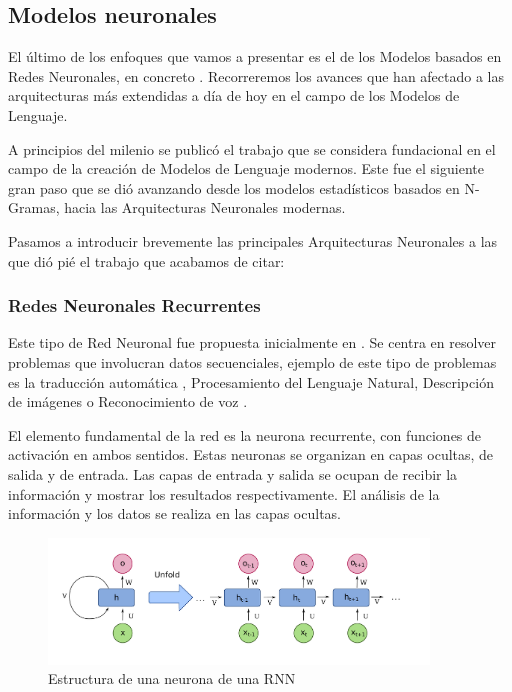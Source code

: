\subsection{Modelos neuronales}

El último de los enfoques que vamos a presentar es el de los Modelos basados en Redes Neuronales, en concreto . Recorreremos los avances que han afectado a las arquitecturas más extendidas a día de hoy en el campo de los Modelos de Lenguaje.

A principios del milenio se publicó el trabajo \cite{bengio2000neural} que se considera fundacional en el campo de la creación de Modelos de Lenguaje modernos. Este fue el siguiente gran paso que se dió avanzando desde los modelos estadísticos basados en N-Gramas, hacia las Arquitecturas Neuronales modernas.

Pasamos a introducir brevemente las principales Arquitecturas Neuronales a las que dió pié el trabajo que acabamos de citar:

\subsubsection{Redes Neuronales Recurrentes}

Este tipo de Red Neuronal fue propuesta inicialmente en \cite{hopfield1982neural}. Se centra en resolver problemas que involucran datos secuenciales, ejemplo de este tipo de problemas es la traducción automática \cite{sutskever2014sequence}, Procesamiento del Lenguaje Natural, Descripción de imágenes \cite{karpathy2015deep} o Reconocimiento de voz \cite{hannun2014deep}.

El elemento fundamental de la red es la neurona recurrente, con funciones de activación en ambos sentidos. Estas neuronas se organizan en capas ocultas, de salida y de entrada. Las capas de entrada y salida se ocupan de recibir la información y mostrar los resultados respectivamente. El análisis de la información y los datos se realiza en las capas ocultas.

\begin{figure}[h]
	\centering
	\includegraphics[width = 0.9\textwidth]{Imagenes/Vectorial/RNN_cell.pdf}
	\caption{Estructura de una neurona de una RNN}%
	\label{fig:RNN}
\end{figure}

